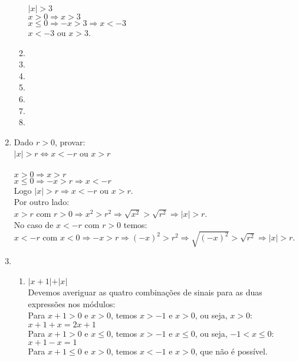 \documentclass[10pt]{book}
\begin{document}
\begin{enumerate}
\begin{enumerate}
		$\vert x \vert > 3$\\		
		$x > 0 \Rightarrow x > 3$\\
		$x \leq 0 \Rightarrow -x > 3 \Rightarrow x < -3$\\
		$x < -3$ ou $x > 3$.
		\item %
		\item %
		\item %
		\addtocounter{enumii}{1}
		\item %
		\item %
		\item %
		\item %
	\end{enumerate}
	\item 
		Dado $r > 0$, provar: \\
		$\vert x \vert > r \Leftrightarrow x < -r$ ou $x > r$\\\\
		$x > 0 \Rightarrow x > r$\\
		$x \leq 0 \Rightarrow -x > r \Rightarrow x < -r$\\
		Logo $\vert x \vert > r \Rightarrow x < -r$ ou $x > r$.\\
		Por outro lado:\\
		$x > r$ com $r > 0 \Rightarrow x^2 > r^2 \Rightarrow \sqrt{x^2} > \sqrt{r^2} \Rightarrow \vert x \vert > r$.\\
		No caso de $x < -r$ com $r > 0$ temos:\\
		$x < -r$ com $x < 0 \Rightarrow -x > r \Rightarrow (-x)^2 > r^2\Rightarrow \sqrt{(-x)^2} > \sqrt{r^2} \Rightarrow \vert x \vert > r$.
	\item %
		\begin{enumerate}
			\item %
			$\vert x + 1 \vert + \vert x \vert$\\
			Devemos averiguar as quatro combinações de sinais para as duas expressões nos módulos:\\
			Para $x + 1 > 0$ e $x > 0$, temos $x > -1$ e $x > 0$, ou seja, $x > 0$:\\
			$x + 1 + x = 2x + 1$\\
			Para $x + 1 > 0$ e $x \leq 0$, temos $x > -1$ e $x \leq 0$, ou seja, $-1 < x \leq 0$:\\
			$x + 1 - x = 1$\\
			Para $x + 1 \leq 0$ e $x > 0$, temos $x < -1$ e $x > 0$, que não é possível.\\

\end{enumerate}
\end{enumerate}
\end{document}
